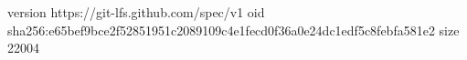 version https://git-lfs.github.com/spec/v1
oid sha256:e65bef9bce2f52851951c2089109c4e1fecd0f36a0e24dc1edf5c8febfa581e2
size 22004
